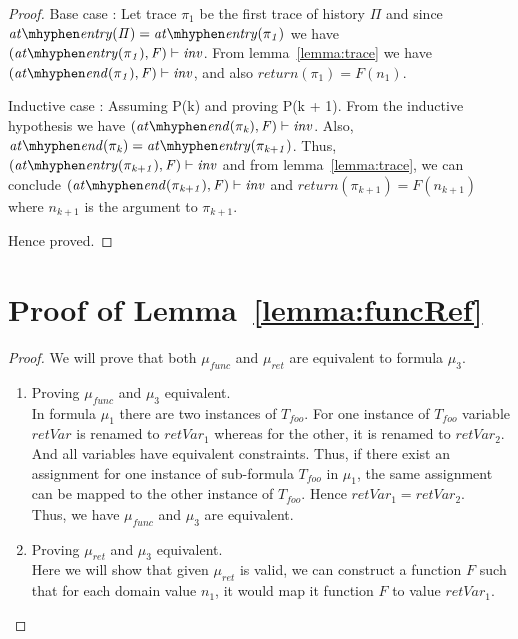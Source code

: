 \documentclass{llncs}
\newcommand{\foo}{\textit{foo}}
\newcommand{\trace}{\pi}
\newcommand{\inv}{\mathit{inv}}
\newcommand{\history}{\Pi}
\newcommand{\pathCondition}{\mathit{T_{\foo}}}
\newcommand{\retVar}{\textit{retVar}}
\newcommand{\F}{\mathit{F}}
\newcommand{\n}{\textit{n}}
\newcommand{\satisfies}{\vdash}
\newcommand{\formula}{\mu}
\newcommand{\atEntry}[1]{\mathit{at \mhyphen entry(#1)}}
\newcommand{\return}[1]{\mathit{return(#1)}}
\newcommand{\atEnd}[1]{\mathit{at \mhyphen end(#1)}}
\begin{document}
\begin{subappendices}
\begin{proof}
  Base case : Let trace $\trace_1$ be the first trace of history
  $\history$ and since $\atEntry{\history} = \atEntry{\trace_1}$ we
  have $(\atEntry{\trace_1}, \F) \satisfies \inv$. From
  lemma~\ref{lemma:trace} we have $(\atEnd{\trace_1}, \F) \satisfies
  \inv$, and also $\return{\trace_1} = \F(\n_1)$.
  
  Inductive case : Assuming P(k) and proving P(k + 1). From the
  inductive hypothesis we have $(\atEnd{\trace_k}, \F) \satisfies
  \inv$. Also, $\atEnd{\trace_k} = \atEntry{\trace_{k+1}}$. Thus,
  $(\atEntry{\trace_{k+1}}, \F) \satisfies \inv$ and from
  lemma~\ref{lemma:trace}, we can conclude $(\atEnd{\trace_{k+1}}, \F)
  \satisfies \inv$ and $\return{\trace_{k+1}} = \F(\n_{k+1})$ where
  $\n_{k+1}$ is the argument to $\trace_{k+1}$.

  Hence proved.
\end{proof}


\section{Proof of Lemma~\ref{lemma:funcRef}}
\begin{proof}
  We will prove that both $\formula_{func}$ and $\formula_{ret}$ are
  equivalent to formula $\formula_3$.
  \begin{enumerate}
  \item Proving $\formula_{func}$ and $\formula_3$ equivalent.\\
    In formula $\formula_1$ there are two instances of
    $\pathCondition$. For one instance of $\pathCondition$ variable $\retVar$ is renamed
    to $\retVar_1$ whereas for the other, it is renamed to
    $\retVar_2$. And all variables have equivalent
    constraints.
    Thus, if there exist 
    an assignment for one instance of sub-formula
    $\pathCondition$ in $\formula_1$, the same assignment can be
    mapped to the other instance of $\pathCondition$.
    Hence $\retVar_1 = \retVar_2$.\\
    Thus, we have $\formula_{func}$ and $\formula_3$ are equivalent.
  \item Proving $\formula_{ret}$ and $\formula_3$ equivalent.\\
    Here we will show that given $\formula_{ret}$ is valid, we can
    construct a function $\F$ such that for each domain value $n_1$,
    it would map it function $\F$ to value $\retVar_1$.
    

\end{enumerate}
\end{proof}
\end{subappendices}
\end{document}
